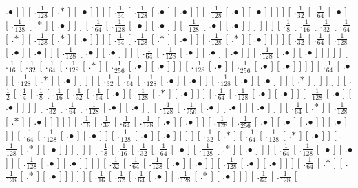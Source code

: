 \documentclass[a4paper,10pt]{article}
\begin{document}
\begin{landscape}
{.$\bullet$ ]  ]  [ .$\frac{1}{128}$  [ .$*$ ]  [ .$\bullet$ ]  ]  ]  [ .$\frac{1}{64}$  [ .$\frac{1}{128}$  [ .$\bullet$ ]  [ .$\bullet$ ]  ]  [ .$\frac{1}{128}$  [ .$\bullet$ ]  [ .$\bullet$ ]  ]  ]  ]  [ .$\frac{1}{32}$  [ .$\frac{1}{64}$  [ .$\bullet$ ]  [ .$\frac{1}{128}$  [ .$*$ ]  [ .$\bullet$ ]  ]  ]  [ .$\frac{1}{64}$  [ .$\frac{1}{128}$  [ .$\bullet$ ]  [ .$\bullet$ ]  ]  [ .$\frac{1}{128}$  [ .$\bullet$ ]  [ .$\bullet$ ]  ]  ]  ]  ]  ]  [ .$\frac{1}{8}$  [ .$\frac{1}{16}$  [ .$\frac{1}{32}$  [ .$\frac{1}{64}$  [ .$*$ ]  [ .$\frac{1}{128}$  [ .$*$ ]  [ .$\bullet$ ]  ]  ]  [ .$\frac{1}{64}$  [ .$\frac{1}{128}$  [ .$*$ ]  [ .$\bullet$ ]  ]  [ .$\frac{1}{128}$  [ .$*$ ]  [ .$\bullet$ ]  ]  ]  ]  [ .$\frac{1}{32}$  [ .$\frac{1}{64}$  [ .$\frac{1}{128}$  [ .$\bullet$ ]  [ .$\bullet$ ]  ]  [ .$\frac{1}{128}$  [ .$\bullet$ ]  [ .$\bullet$ ]  ]  ]  [ .$\frac{1}{64}$  [ .$\frac{1}{128}$  [ .$\bullet$ ]  [ .$\bullet$ ]  [ .$\bullet$ ]  ]  [ .$\frac{1}{128}$  [ .$\bullet$ ]  [ .$\bullet$ ]  ]  ]  ]  ]  [ .$\frac{1}{16}$  [ .$\frac{1}{32}$  [ .$\frac{1}{64}$  [ .$\frac{1}{128}$  [ .$*$ ]  [ .$\frac{1}{256}$  [ .$\bullet$ ]  [ .$\bullet$ ]  ]  ]  [ .$\frac{1}{128}$  [ .$\bullet$ ]  [ .$\frac{1}{256}$  [ .$\bullet$ ]  [ .$\bullet$ ]  ]  ]  ]  [ .$\frac{1}{64}$  [ .$\bullet$ ]  [ .$\frac{1}{128}$  [ .$*$ ]  [ .$\bullet$ ]  ]  ]  ]  [ .$\frac{1}{32}$  [ .$\frac{1}{64}$  [ .$\frac{1}{128}$  [ .$\bullet$ ]  [ .$\bullet$ ]  ]  [ .$\frac{1}{128}$  [ .$\bullet$ ]  [ .$\bullet$ ]  ]  ]  [ .$*$ ]  ]  ]  ]  ]  ]  [ .$\frac{1}{2}$  [ .$\frac{1}{4}$  [ .$\frac{1}{8}$  [ .$\frac{1}{16}$  [ .$\frac{1}{32}$  [ .$\frac{1}{64}$  [ .$\bullet$ ]  [ .$\frac{1}{128}$  [ .$*$ ]  [ .$\bullet$ ]  ]  ]  [ .$\frac{1}{64}$  [ .$\frac{1}{128}$  [ .$\bullet$ ]  [ .$\bullet$ ]  ]  [ .$\frac{1}{128}$  [ .$\bullet$ ]  [ .$\bullet$ ]  ]  ]  ]  [ .$\frac{1}{32}$  [ .$\frac{1}{64}$  [ .$\frac{1}{128}$  [ .$\bullet$ ]  [ .$\bullet$ ]  ]  [ .$\frac{1}{128}$  [ .$\frac{1}{256}$  [ .$\bullet$ ]  [ .$\bullet$ ]  ]  [ .$\bullet$ ]  ]  ]  [ .$\frac{1}{64}$  [ .$*$ ]  [ .$\frac{1}{128}$  [ .$*$ ]  [ .$\bullet$ ]  ]  ]  ]  ]  [ .$\frac{1}{16}$  [ .$\frac{1}{32}$  [ .$\frac{1}{64}$  [ .$\frac{1}{128}$  [ .$\bullet$ ]  [ .$\bullet$ ]  ]  [ .$\frac{1}{128}$  [ .$\frac{1}{256}$  [ .$\bullet$ ]  [ .$\bullet$ ]  [ .$\bullet$ ]  ]  [ .$\bullet$ ]  ]  ]  [ .$\frac{1}{64}$  [ .$\frac{1}{128}$  [ .$\bullet$ ]  [ .$\bullet$ ]  ]  [ .$\frac{1}{128}$  [ .$\bullet$ ]  [ .$\bullet$ ]  ]  ]  ]  [ .$\frac{1}{32}$  [ .$*$ ]  [ .$\frac{1}{64}$  [ .$\frac{1}{128}$  [ .$*$ ]  [ .$\bullet$ ]  ]  [ .$\frac{1}{128}$  [ .$*$ ]  [ .$\bullet$ ]  ]  ]  ]  ]  ]  [ .$\frac{1}{8}$  [ .$\frac{1}{16}$  [ .$\frac{1}{32}$  [ .$\frac{1}{64}$  [ .$\bullet$ ]  [ .$\frac{1}{128}$  [ .$*$ ]  [ .$\bullet$ ]  ]  ]  [ .$\frac{1}{64}$  [ .$\frac{1}{128}$  [ .$\bullet$ ]  [ .$\bullet$ ]  ]  [ .$\frac{1}{128}$  [ .$\bullet$ ]  [ .$\bullet$ ]  ]  ]  ]  [ .$\frac{1}{32}$  [ .$\frac{1}{64}$  [ .$\frac{1}{128}$  [ .$\bullet$ ]  [ .$\bullet$ ]  ]  [ .$\frac{1}{128}$  [ .$\bullet$ ]  [ .$\bullet$ ]  ]  ]  [ .$\frac{1}{64}$  [ .$*$ ]  [ .$\frac{1}{128}$  [ .$*$ ]  [ .$\bullet$ ]  ]  ]  ]  ]  [ .$\frac{1}{16}$  [ .$\frac{1}{32}$  [ .$\frac{1}{64}$  [ .$\bullet$ ]  [ .$\frac{1}{128}$  [ .$*$ ]  [ .$\bullet$ ]  ]  ]  [ .$\frac{1}{64}$  [ .$\frac{1}{128}$  [ }
\end{landscape}
\end{document}
